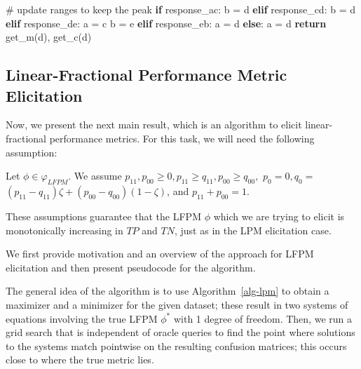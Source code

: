 \documentclass[
  letterpaper,
  numbers=noenddot,
  DIV=11]{scrreprt}
\newenvironment{Shaded}{\begin{snugshade}}{\end{snugshade}}
\newcommand{\CommentTok}[1]{\textcolor[rgb]{0.37,0.37,0.37}{#1}}
\newcommand{\ControlFlowTok}[1]{\textcolor[rgb]{0.00,0.23,0.31}{\textbf{#1}}}
\newcommand{\NormalTok}[1]{\textcolor[rgb]{0.00,0.23,0.31}{#1}}
\newcommand{\OperatorTok}[1]{\textcolor[rgb]{0.37,0.37,0.37}{#1}}
\theoremstyle{definition}
\theoremstyle{plain}
\theoremstyle{plain}
\theoremstyle{remark}
\begin{document}
\begin{tcolorbox}[colframe=.grey, title=\faCode \enspace Code]
\begin{Shaded}
\begin{Highlighting}[numbers=left,,]
        \CommentTok{\# update ranges to keep the peak}
        \ControlFlowTok{if}\NormalTok{ response\_ac:}
\NormalTok{            b }\OperatorTok{=}\NormalTok{ d}
        \ControlFlowTok{elif}\NormalTok{ response\_cd:}
\NormalTok{            b }\OperatorTok{=}\NormalTok{ d}
        \ControlFlowTok{elif}\NormalTok{ response\_de:}
\NormalTok{            a }\OperatorTok{=}\NormalTok{ c}
\NormalTok{            b }\OperatorTok{=}\NormalTok{ e}
        \ControlFlowTok{elif}\NormalTok{ response\_eb:}
\NormalTok{            a }\OperatorTok{=}\NormalTok{ d}
        \ControlFlowTok{else}\NormalTok{:}
\NormalTok{            a }\OperatorTok{=}\NormalTok{ d}
    \ControlFlowTok{return}\NormalTok{ get\_m(d), get\_c(d)}
\end{Highlighting}
\end{Shaded}

\end{tcolorbox}

\subsection{Linear-Fractional Performance Metric
Elicitation}\label{sec-lfpm-elicitation}

Now, we present the next main result, which is an algorithm to elicit
linear-fractional performance metrics. For this task, we will need the
following assumption:

Let \(\phi \in \varphi_{L F P M}\). We assume
\(p_{11}, p_{00} \geq 0, p_{11} \geq q_{11}, p_{00} \geq q_{00},\)
\(p_{0}=0, q_{0}=\)
\(\left(p_{11}-q_{11}\right) \zeta+\left(p_{00}-q_{00}\right)(1-\zeta)\),
and \(p_{11}+p_{00}=1\).

These assumptions guarantee that the LFPM \(\phi\) which we are trying
to elicit is monotonically increasing in \(TP\) and \(TN\), just as in
the LPM elicitation case.

We first provide motivation and an overview of the approach for LFPM
elicitation and then present pseudocode for the algorithm.

The general idea of the algorithm is to use  Algorithm~\ref{alg-lpm}  to
obtain a maximizer and a minimizer for the given dataset; these result
in two systems of equations involving the true LFPM \(\phi^*\) with 1
degree of freedom. Then, we run a grid search that is independent of
oracle queries to find the point where solutions to the systems match
pointwise on the resulting confusion matrices; this occurs close to
where the true metric lies.
\end{document}

